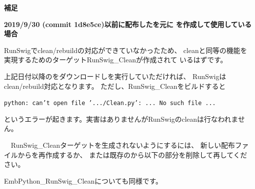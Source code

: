 \bigskip
\bigskip
\noindent
\thinrule{\linewidth}
\noindent
\bf{補足}　
\begin{narrow}
	\bf{2019/9/30 (commit 1d8e5ce)以前に配布したを元に
	\CMakeLists{}を作成して使用している場合}

	\medskip
	RunSwigでclean/rebuildの対応ができていなかったため、
	cleanと同等の機能を実現するためのターゲットRunSwig\_Cleanが作成されて
	いるはずです。

	上記日付以降の\SprLib をダウンロードし\cmake を実行していただければ、
	RunSwigはclean/rebuild対応となります。
	ただし、RunSwig\_Cleanをビルドすると
	\begin{narrow}
	\tt{python: can't open file '.../Clean.py': ... No such file ...}
	\end{narrow}
	というエラーが起きます。実害はありませんがRunSwigのcleanは行なわれません。

	\medskip
	　RunSwig\_Cleanターゲットを生成されないようにするには、
	新しい配布ファイルから\CMakeLists{}を再作成するか、
	または既存の\CMakeLists{}から以下の部分を削除して再\cmake してください。

	\begin{narrow}\begin{figure}[h]
	    \begin{narrow}[30pt]
		\begin{center}\end{center}
		\label{fig:SpringheadLibraryTree}
	    \end{narrow}
	\end{figure}\end{narrow}
	
	EmbPython\_RunSwig\_Cleanについても同様です。	
	
\end{narrow}

